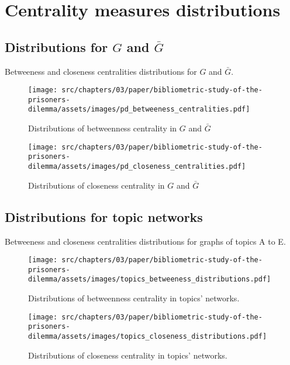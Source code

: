\chapter{Centrality measures distributions}

\section{Distributions for \(G\) and \(\bar{G}\)}

Betweeness and closeness centralities distributions for \(G\) and \(\bar{G}\).

\begin{figure}[!hbtp]
    \centering
    \texttt{[image: src/chapters/03/paper/bibliometric-study-of-the-prisoners-dilemma/assets/images/pd\_betweeness\_centralities.pdf]}
    \caption{Distributions of betweenness centrality in \(G\) and \(\bar{G}\)}
    \label{fig:bc_distributions}
\end{figure}

\begin{figure}[!hbtp]
    \centering
    \texttt{[image: src/chapters/03/paper/bibliometric-study-of-the-prisoners-dilemma/assets/images/pd\_closeness\_centralities.pdf]}
    \caption{Distributions of closeness centrality in \(G\) and \(\bar{G}\)}
    \label{fig:cc_distributions}
\end{figure}

\section{Distributions for topic networks}\label{appendix:distributions}

Betweeness and closeness centralities distributions for graphs of topics A to E.

\begin{figure}[!hbtp]
    \centering
    \texttt{[image: src/chapters/03/paper/bibliometric-study-of-the-prisoners-dilemma/assets/images/topics\_betweeness\_distributions.pdf]}
    \caption{Distributions of betweenness centrality in topics' networks.}
    \label{fig:bc_distributions_topics}
\end{figure}

\begin{figure}[!hbtp]
    \centering
    \texttt{[image: src/chapters/03/paper/bibliometric-study-of-the-prisoners-dilemma/assets/images/topics\_closeness\_distributions.pdf]}
    \caption{Distributions of closeness centrality in topics' networks.}
    \label{fig:cc_distributions_topics}
\end{figure}